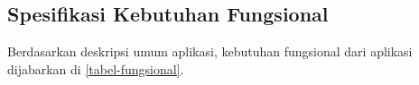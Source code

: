  \subsection{Spesifikasi Kebutuhan Fungsional}
  \vspace{-5mm}
  Berdasarkan deskripsi umum aplikasi, kebutuhan fungsional dari aplikasi dijabarkan di \ref{tabel-fungsional}.

  